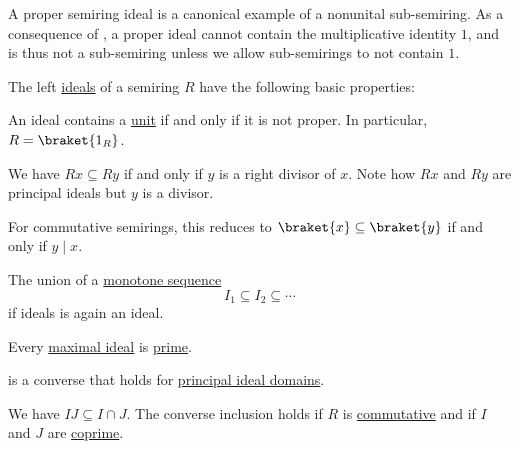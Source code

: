 \begin{remark}\label{rem:semiring_ideal_as_sub_semiring}
  A proper semiring ideal is a canonical example of a nonunital sub-semiring. As a consequence of , a proper ideal cannot contain the multiplicative identity \( 1 \), and is thus not a sub-semiring unless we allow sub-semirings to not contain \( 1 \).
\end{remark}

\begin{proposition}\label{thm:def:semiring_ideal/properties}
  The left \hyperref[def:semiring_ideal]{ideals} of a semiring \( R \) have the following basic properties:
  \begin{thmenum}[series=thm:def:semiring_ideal/properties]
     An ideal contains a \hyperref[def:divisibility/unit]{unit} if and only if it is not proper. In particular, \( R = \braket{ 1_R } \).

     We have \( Rx \subseteq Ry \) if and only if \( y \) is a right divisor of \( x \). Note how \( Rx \) and \( Ry \) are  principal ideals but \( y \) is a  divisor.

    For commutative semirings, this reduces to \( \braket{ x } \subseteq \braket{ y } \) if and only if \( y \mid x \).

     The union of a \hyperref[eq:def:partially_ordered_set/homomorphism/sequence]{monotone sequence}
    \begin{equation*}
      I_1 \subseteq I_2 \subseteq \cdots
    \end{equation*}
    if ideals is again an ideal.

     Every \hyperref[def:semiring_ideal/maximal]{maximal ideal} is \hyperref[def:semiring_ideal/prime]{prime}.

     is a converse that holds for \hyperref[def:principal_ideal_domain]{principal ideal domains}.

     We have \( IJ \subseteq I \cap J \). The converse inclusion holds if \( R \) is \hyperref[def:semiring/commutative]{commutative} and if \( I \) and \( J \) are \hyperref[def:semiring_ideal/coprime]{coprime}.
  \end{thmenum}


\end{proposition}
